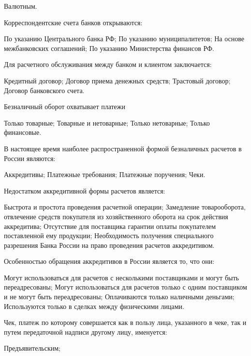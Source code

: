 \documentclass[12pt, table]{exam}
\begin{document}
\begin{questions}
\begin{multicols}{2}
\begin{choices}
	 \choice Валютным.
	 \end{choices}
\question Корреспондентские счета банков открываются:
	 \begin{choices}
	 \choice По указанию Центрального банка РФ;
	 \choice По указанию муниципалитетов;
	 \CC На основе межбанковских соглашений;
	 \choice По указанию Министерства финансов РФ.
	 \end{choices}
\question Для расчетного обслуживания между банком и клиентом заключается:
	 \begin{choices}
	 \choice Кредитный договор;
	 \choice Договор приема денежных средств;
	 \choice Трастовый договор;
	 \CC Договор банковского счета.
	 \end{choices}
\question Безналичный оборот охватывает  платежи
	 \begin{choices}
	 \choice Только товарные;
	 \CC Товарные и нетоварные;
	 \choice Только нетоварные;
	 \choice Только финансовые.
	 \end{choices}
\question В настоящее время наиболее распространенной формой безналичных расчетов в России являются:
	 \begin{choices}
	 \choice Аккредитивы;
	 \choice Платежные требования;
	 \CC Платежные поручения;
	 \choice Чеки.
	 \end{choices}
\question Недостатком аккредитивной формы расчетов является:
	 \begin{choices}
	 \choice Быстрота и простота проведения расчетной операции;
	 \CC Замедление товарооборота, отвлечение средств покупателя из хозяйственного оборота на срок действия аккредитива;
	 \choice Отсутствие для поставщика гарантии оплаты покупателем поставленной ему продукции;
	 \choice Необходимость получения специального разрешения Банка России на право проведения расчетов аккредитивом.
	 \end{choices}
\question Особенностью обращения аккредитивов в России является то, что они:
	 \begin{choices}
	 \choice Могут использоваться для расчетов с несколькими поставщиками и могут быть переадресованы;
	 \CC Могут использоваться для расчетов только с одним поставщиком и не могут быть переадресованы;
	 \choice Оплачиваются только наличными деньгами;
	 \choice Используются только в сделках между физическими лицами.
	 \end{choices}
\question Чек, платеж по которому совершается как в пользу лица, указанного в чеке, так и путем передаточной надписи другому лицу, именуется:
	 \begin{choices}
	 \choice Предъявительским;

\end{choices}
\end{multicols}
\end{questions}
\end{document}
